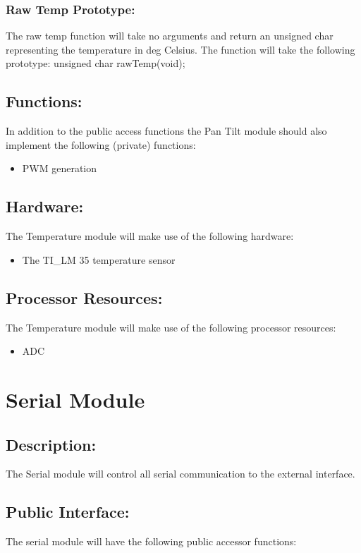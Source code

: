 \documentclass[]{article}
\begin{document}
\subsubsection{Raw Temp Prototype:}
The raw temp function will take no arguments and return an unsigned char representing the temperature in deg Celsius. The function will take the following prototype: \newline \newline
unsigned char rawTemp(void);

\subsection{Functions:}
In addition to the public access functions the Pan Tilt module should also implement the following (private) functions:
\begin{itemize}
	\item PWM generation
\end{itemize}

\subsection{Hardware:}
The Temperature module will make use of the following hardware:
\begin{itemize}
	\item The TI\_LM 35 temperature sensor
\end{itemize}

\subsection{Processor Resources:}
The Temperature module will make use of the following processor resources:

\begin{itemize}
	\item ADC
\end{itemize}

\newpage
\section{Serial Module}

\subsection{Description:}
The Serial module will control all serial communication to the external interface.

\subsection{Public Interface:}
The serial module will have the following public accessor functions:
\end{document}
